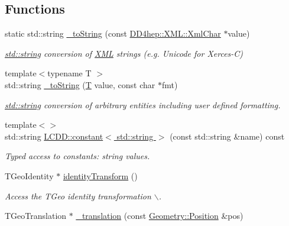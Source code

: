 \subsection*{Functions}
\begin{DoxyCompactItemize}
\item 
static std::string \hyperlink{namespace_d_d4hep_1_1_geometry_abb6544cdd599b803023143aefeec44d7}{\_\-toString} (const \hyperlink{namespace_d_d4hep_1_1_x_m_l_a09e5d9cc86ed782f6826dfe0778c1815}{DD4hep::XML::XmlChar} $\ast$value)
\begin{DoxyCompactList}\small\item\em \hyperlink{classstd_1_1string}{std::string} conversion of \hyperlink{namespace_d_d4hep_1_1_x_m_l}{XML} strings (e.g. Unicode for Xerces-\/C) \item\end{DoxyCompactList}\item 
{\footnotesize template$<$typename T $>$ }\\std::string \hyperlink{namespace_d_d4hep_1_1_geometry_a52e595323e8bc63ad176e45ff89fa0a5}{\_\-toString} (\hyperlink{class_t}{T} value, const char $\ast$fmt)
\begin{DoxyCompactList}\small\item\em \hyperlink{classstd_1_1string}{std::string} conversion of arbitrary entities including user defined formatting. \item\end{DoxyCompactList}\item 
{\footnotesize template$<$$>$ }\\std::string \hyperlink{namespace_d_d4hep_1_1_geometry_a843a7721428e666fa132e20b0706a6ff}{LCDD::constant$<$ std::string $>$} (const std::string \&name) const 
\begin{DoxyCompactList}\small\item\em Typed access to constants: string values. \item\end{DoxyCompactList}\item 
TGeoIdentity $\ast$ \hyperlink{group___d_d4_h_e_p___g_e_o_m_e_t_r_y_gacb7266110e19d4dda6cc6b2ebc57bd39}{identityTransform} ()
\begin{DoxyCompactList}\small\item\em Access the TGeo identity transformation $\backslash$. \item\end{DoxyCompactList}\item 
TGeoTranslation $\ast$ \hyperlink{group___d_d4_h_e_p___g_e_o_m_e_t_r_y_ga2a9c214ef0a2444cccf194669fe81771}{\_\-translation} (const \hyperlink{namespace_d_d4hep_1_1_geometry_a55083902099d03506c6db01b80404900}{Geometry::Position} \&pos)

\end{DoxyCompactItemize}
